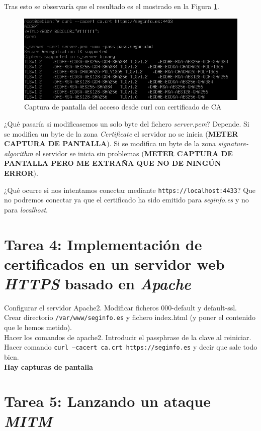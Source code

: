 \documentclass[10pt,a4paper]{article}
\begin{document}
Tras esto se observaría que el resultado es el mostrado en la Figura \ref{fig:tarea3_paso3}.

\begin{figure}[h!]
\centering
\includegraphics[scale=0.6]{images/tarea3_paso3.png}
\caption{Captura de pantalla del acceso desde curl con certificado de CA}
\label{fig:tarea3_paso3}
\end{figure}


¿Qué pasaría si modificasemos un solo byte del fichero \emph{server.pem}? Depende. Si se modifica un byte de la zona \emph{Certificate} el servidor no se inicia (\textbf{METER CAPTURA DE PANTALLA}). Si se modifica un byte de la zona \emph{signature-algorithm} el servidor se inicia sin problemas (\textbf{METER CAPTURA DE PANTALLA PERO ME EXTRAÑA QUE NO DE NINGÚN ERROR}).

¿Qué ocurre si nos intentamos conectar mediante \texttt{https://localhost:4433}? Que no podremos conectar ya que el certificado ha sido emitido para \emph{seginfo.es} y no para \emph{localhost}.


\section{Tarea 4: Implementación de certificados en un servidor web \emph{HTTPS} basado en \emph{Apache}}


Configurar el servidor Apache2. Modificar ficheros 000-default y default-ssl.\\
Crear directorio \texttt{/var/www/seginfo.es} y fichero index.html (y poner el contenido que le hemos metido).\\
Hacer los comandos de apache2. Introducir el passphrase de la clave al reiniciar.\\
Hacer comando \texttt{curl --cacert ca.crt https://seginfo.es} y decir que sale todo bien.\\

\textbf{Hay capturas de pantalla}


\section{Tarea 5: Lanzando un ataque \emph{MITM}}
\end{document}
